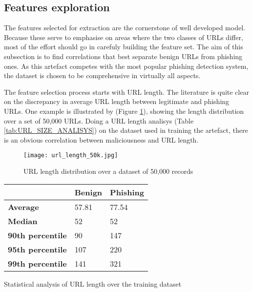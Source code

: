 \subsection{Features exploration}
The features selected for extraction are the cornerstone of well developed model. Because these serve to emphasise on areas where the two classes of URLs differ, most of the effort should go in carefuly building the feature set. The aim of this subsection is to find correlations that best separate benign URLs from phishing ones. As this artefact competes with the most popular phishing detection system, the dataset is chosen to be comprehensive in virtually all aspects.

The feature selection process starts with URL length. The literature is quite clear on the discrepancy in average URL length between legitimate and phishing URLs. One example is illustrated by \cite{STACKED_ML_URL_HTML} (Figure \ref{fig:URL_LENGTH_DISTRIBUTION}), showing the length distribution over a set of 50,000 URLs. Doing a URL length analisys (Table \ref{tab:URL_SIZE_ANALISYS}) on the dataset used in training the artefact, there is an obvious correlation between maliciousness and URL length.

\begin{figure}[t]
	\centering
	\texttt{[image: url\_length\_50k.jpg]}
	\caption{URL length distribution over a dataset of 50,000 records}
	\label{fig:URL_LENGTH_DISTRIBUTION}
\end{figure}

\begin{singlespace}
	\small
	\begin{center}
		\label{tab:URL_SIZE_ANALISYS}
		\begin{tabularx}{\textwidth}{ | X | X | X | }
			\hline
			                         & \textbf{Benign} & \textbf{Phishing} \\
			\hline
			\textbf{Average}         & 57.81           & 77.54             \\
			\hline
			\textbf{Median}          & 52              & 52                \\
			\hline
			\textbf{90th percentile} & 90              & 147               \\
			\hline
			\textbf{95th percentile} & 107             & 220               \\
			\hline
			\textbf{99th percentile} & 141             & 321               \\
			\hline
		\end{tabularx}
		\captionsetup{type=table}\caption{Statistical analysis of URL length over the training dataset}
	\end{center}
\end{singlespace}


